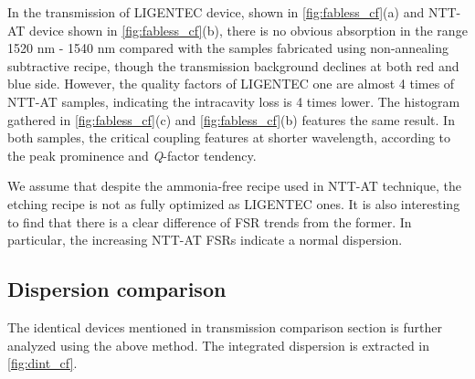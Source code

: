 In the transmission of LIGENTEC device, shown in \autoref{fig:fabless_cf}(a)  and NTT-AT device shown in \autoref{fig:fabless_cf}(b), there is no obvious absorption in the range 1520 nm - 1540 nm compared with the samples fabricated using non-annealing subtractive recipe, though the transmission background declines at both red and blue side. However, the quality factors of LIGENTEC one are almost 4 times of NTT-AT samples, indicating the intracavity loss is 4 times lower. The histogram gathered in \autoref{fig:fabless_cf}(c) and \autoref{fig:fabless_cf}(b) features the same result.
In both samples, the critical coupling features at shorter wavelength, according to the peak prominence and \textit{Q}-factor tendency. 

We assume that despite the ammonia-free recipe used in NTT-AT technique, the etching recipe is not as fully optimized as LIGENTEC ones. It is also interesting to find that there is a clear difference of FSR trends from the former. In particular, the increasing NTT-AT FSRs indicate a normal dispersion.


\subsection{Dispersion comparison}

The identical devices mentioned in transmission comparison section is further analyzed using the above method. The integrated dispersion is extracted in \autoref{fig:dint_cf}.


\begin{figure}
	\centering
	
	\mycaption{}{}
	\label{fig:dint_cf}
\end{figure}